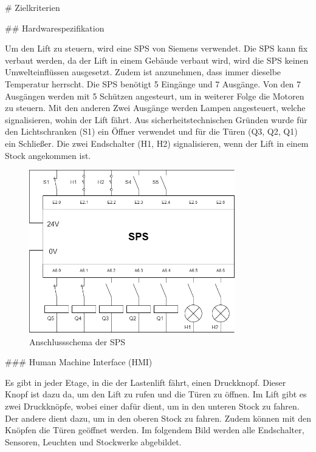 \begin{markdown}
# Zielkriterien

## Hardwarespezifikation

Um den Lift zu steuern, wird eine SPS von Siemens verwendet. Die SPS kann fix verbaut werden, da der Lift in einem Gebäude verbaut wird, wird die SPS keinen Umwelteinflüssen ausgesetzt. Zudem ist anzunehmen, dass immer dieselbe Temperatur herrscht. Die SPS benötigt 5 Eingänge und 7 Ausgänge. Von den 7 Ausgängen werden mit 5 Schützen angesteurt, um in weiterer Folge die Motoren zu steuern. Mit den anderen Zwei Ausgänge werden Lampen angesteuert, welche signalisieren, wohin der Lift fährt. Aus sicherheitstechnischen Gründen wurde für den Lichtschranken (S1) ein Öffner verwendet und für die Türen (Q3, Q2, Q1) ein Schließer. Die zwei Endschalter (H1, H2) signalisieren, wenn der Lift in einem Stock angekommen ist.

\begin{figure}[h!]
    \centering
    \includegraphics[width=0.8\textwidth]{./images/Anschlussschema.png}
    \caption[Anschlussschema der SPS]{Anschlussschema der SPS}
\end{figure}

### Human Machine Interface (HMI)

Es gibt in jeder Etage, in die der Lastenlift fährt, einen Druckknopf. Dieser Knopf ist dazu da, um den Lift zu rufen und die Türen zu öffnen. Im Lift gibt es zwei Druckknöpfe, wobei einer dafür dient, um in den unteren Stock zu fahren. Der andere dient dazu, um in den oberen Stock zu fahren. Zudem können mit den Knöpfen die Türen geöffnet werden. Im folgendem Bild werden alle Endschalter, Sensoren, Leuchten und Stockwerke abgebildet.


\end{markdown}

